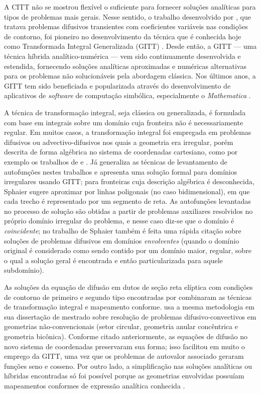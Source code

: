 A CITT não se mostrou flexível o suficiente para fornecer
soluções analíticas para tipos de problemas mais gerais. Nesse sentido, o trabalho desenvolvido por \cite{artigo_murray},
que tratava problemas difusivos transientes com coeficientes variáveis nas condições de contorno, foi pioneiro no desenvolvimento da técnica
que é conhecida hoje como Transformada Integral Generalizada (GITT) \citep{livro_integral_transforms_cotta}. Desde então, a GITT --- uma técnica
híbrida analítico-numérica --- vem sido continuamente desenvolvida e estendida, fornecendo soluções analíticas aproximadas e numéricas alternativas
para os problemas não solucionáveis pela abordagem clássica. Nos últimos anos, a GITT tem sido beneficiada e popularizada através do desenvolvimento de
aplicativos de \textit{software} de computação simbólica, especialmente o \textit{Mathematica}\textsuperscript{\textregistered} \citep{artigo_mathematica}.

A técnica de transformação integral, seja clássica ou generalizada, é formulada com base em integrais sobre um domínio cuja
fronteira não é necessariamente regular. Em muitos casos, a transformação integral foi empregada em problemas difusivos ou advectivo-difusivos nos quais a geometria
era irregular, porém descrita de forma algébrica no sistema de coordenadas cartesiano, como por exemplo os trabalhos de \cite{artigo_aparecido, artigo_aparecido_2, artigo_aparecido_3, artigo_fausto} e \cite{artigo_perez}.
Já \cite{tese_sphaier} generaliza as técnicas de levantamento de autofunções nestes trabalhos e apresenta uma solução formal para domínios irregulares usando GITT;
para fronteiras cuja descrição algébrica é desconhecida, Sphaier sugere aproximar por linhas poligonais (no caso bidimensional), em que cada
trecho é representado por um segmento de reta. As autofunções levantadas no processo de solução são obtidas a partir de problemas auxiliares resolvidos no próprio
domínio irregular do problema, e nesse caso diz-se que o domínio é \textit{coincidente}; no trabalho de Sphaier também é feita uma rápida citação sobre soluções de problemas difusivos em domínios \textit{envolventes}
(quando o domínio original é considerado como sendo contido por um domínio maior, regular, sobre o qual a solução geral é encontrada e então particularizada
para aquele subdomínio).

As soluções da equação de difusão em dutos de seção reta elíptica com condições de contorno de primeiro e segundo tipo encontradas por
 \citet{trabalho_maia_1, trabalho_maia_2} combinaram as técnicas de transformação integral e mapeamento conforme. 
\cite{tese_antonini} usa a mesma metodologia em sua dissertação de mestrado sobre resolução de problemas difusivo-convectivos em geometrias não-convencionais (setor circular, geometria anular
concêntrica e geometria bicônica). Conforme citado anteriormente, as equações de difusão no novo sistema de coordenadas preservaram sua forma; isso facilitou em
muito o emprego da GITT, uma vez que os problemas de autovalor associado geraram funções seno e cosseno. Por outro lado, a
simplificação nas soluções analíticas ou híbridas encontradas só foi possível porque as geometrias envolvidas possuíam mapeamentos conformes de expressão analítica
conhecida \citep{livro_brown}.

